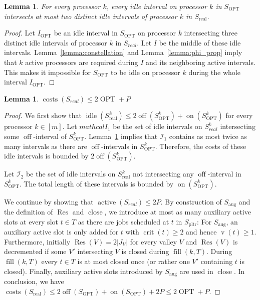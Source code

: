 \documentclass[a4paper]{article}
\DeclareMathOperator{\on}{on}
\DeclareMathOperator{\off}{off}
\DeclareMathOperator{\idle}{idle}
\DeclareMathOperator{\act}{active}
\DeclareMathOperator{\costs}{costs}
\DeclareMathOperator{\opt}{OPT}
\DeclareMathOperator{\PLTR}{pltr}
\DeclareMathOperator{\aug}{aug}
\DeclareMathOperator{\real}{real}
\DeclareMathOperator{\vol}{v}
\DeclareMathOperator{\crit}{crit}
\DeclareMathOperator{\fillop}{fill}
\DeclareMathOperator{\close}{close}
\DeclareMathOperator{\res}{Res}
\newtheorem{lemma}[theorem]{Lemma}
\begin{document}
\begin{lemma}\label{lemma:intersection}
  For every processor $k$, every idle interval on processor $k$ in $S_{\opt}$ intersects at most two distinct idle intervals of processor $k$ in $S_{\real}$.
\end{lemma}
\begin{proof}
  Let $I_{\opt}$ be an idle interval in $S_{\opt}$ on processor $k$ intersecting three distinct idle intervals of processor $k$ in $S_{real}$.
  Let $I$ be the middle of these idle intervals.
  Lemma~\ref{lemma:constellation} and Lemma~\ref{lemma:phi_prop} imply that $k$ active processors are required during $I$ and its neighboring active intervals.
  This makes it impossible for $S_{\opt}$ to be idle on processor $k$ during the whole interval $I_{\opt}$.
\end{proof}

\begin{lemma}\label{lemma:costs_s_real}
  $\costs(S_{real}) \leq 2 \opt + P$
\end{lemma}
\begin{proof}
  We first show that $\idle(S^k_{\real}) \leq 2 \off(S^k_{\opt}) + \on(S^k_{\opt})$ for every processor $k \in [m]$.
  Let $mathcal{I}_1$ be the set of idle intervals on $S^k_{real}$ intersecting some $\off$-interval of $S^k_{\opt}$.
  Lemma~\ref{lemma:intersection} implies that $\mathcal{I}_1$ contains as most twice as many intervals as there are $\off$-intervals in $S^k_{\opt}$.
  Therefore, the costs of these idle intervals is bounded by $2 \off(S^k_{\opt})$.

  Let $\mathcal{I}_2$ be the set of idle intervals on $S^k_{\real}$ not intersecting any $\off$-interval in $S^k_{\opt}$.
  The total length of these intervals is bounded by $\on(S^k_{\opt})$.

  We continue by showing that $\act(S_{real}) \leq 2 P$.
  By construction of $S_{\aug}$ and the definition of $\res$ and $\close$, we introduce at most as many auxiliary active slots at every slot $t \in T$ as there are jobs scheduled at $t$ in $S_{\PLTR}$:
  For $S_{\aug}$, an auxiliary active slot is only added for $t$ with $\crit(t) \geq 2$ and hence $\vol(t) \geq 1$.
  Furthermore, initially $\res(V) = 2 |J_V|$ for every valley $V$ and $\res(V)$ is decremented if some $V'$ intersecting $V$ is closed during $\fillop(k, T)$.
  During $\fillop(k, T)$ every $t \in T$ is at most closed once (or rather one $V'$ containing $t$ is closed).
  Finally, auxiliary active slots introduced by $S_{\aug}$ are used in $\close$.
  In conclusion, we have $\costs(S_{\real}) \leq 2 \off(S_{\opt}) + \on(S_{\opt}) + 2 P \leq 2 \opt + P$.
\end{proof}
\end{document}
